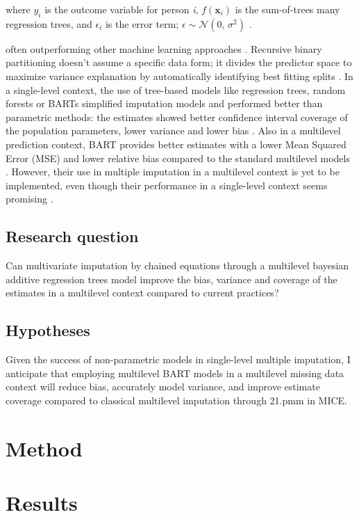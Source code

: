 \documentclass[10pt, a4paper, titlepage]{article}
\begin{document}
where $y_i$ is the outcome variable for person \textit{i}, $f(\textbf{x}_i)$ is the sum-of-trees many regression trees, and $\epsilon_i$ is the error term; $\epsilon \sim \mathcal{N}(0,\,\sigma^{2})$ \cite{chipman2010, hill2020}.


often outperforming other machine learning approaches \cite{hill2020}. Recursive binary partitioning doesn’t assume a specific data form; it divides the predictor space to maximize variance explanation by automatically identifying best fitting splits \cite{hastie2017, james2021, salditt2023}. In a single-level context, the use of tree-based models like regression trees, random forests or BARTs simplified imputation models and performed better than parametric methods: the estimates showed better confidence interval coverage of the population parameters, lower variance and lower bias \cite{burgette2010, xu2016}. Also in a multilevel prediction context, BART provides better estimates with a lower Mean Squared Error (MSE) and lower relative bias compared to the standard multilevel models \cite{wagner2020, chen2020}. However, their use in multiple imputation in a multilevel context is yet to be implemented, even though their performance in a single-level context seems promising \cite{burgette2010, xu2016}.

\subsection{Research question}
Can multivariate imputation by chained equations through a multilevel bayesian additive regression trees model improve the bias, variance and coverage of the estimates in a multilevel context compared to current practices?

\subsection{Hypotheses}
Given the success of non-parametric models in single-level multiple imputation, I anticipate that employing multilevel BART models in a multilevel missing data context will reduce bias, accurately model variance, and improve estimate coverage compared to classical multilevel imputation through 21.pmm in MICE.

\section{Method}


\section{Results}

\newpage


\end{document}
